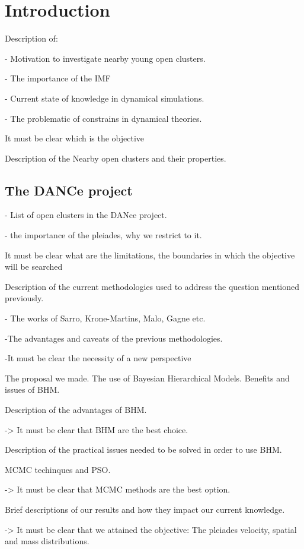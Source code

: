 \chapter{Introduction}
\label{chap:introduction}

\nocite{*} %

Description of:

- Motivation to investigate nearby young open clusters.

- The importance of the IMF

- Current state of knowledge in dynamical simulations.

- The problematic of constrains in dynamical theories.

It must be clear which is the objective

Description of the Nearby open clusters and their properties.

\section{The DANCe project}

- List of open clusters in the DANce project.

- the importance of the pleiades, why we restrict to it.

It must be clear what are the limitations, the boundaries in which the objective will be searched

Description of the current methodologies used to address the question mentioned previously.

- The works of Sarro, Krone-Martins, Malo, Gagne etc.

-The advantages and caveats of the previous methodologies. 

-It must be clear the necessity of a new perspective

The proposal we made. The use of Bayesian Hierarchical Models. Benefits and issues of BHM.

Description of the advantages of BHM.

-> It must be clear that BHM are the best choice.

Description of the practical issues needed to be solved in order to use BHM.

MCMC techinques and  PSO.

-> It must be clear that MCMC methods are the best option.

Brief descriptions of our results and how they impact our current knowledge.

-> It must be clear that we attained the objective: The pleiades velocity, spatial and mass distributions.
 



